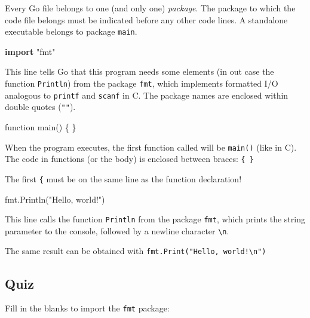 \documentclass[]{book}
\newenvironment{Shaded}{\begin{snugshade}}{\end{snugshade}}
\newcommand{\KeywordTok}[1]{\textcolor[rgb]{0.13,0.29,0.53}{\textbf{#1}}}
\newcommand{\NormalTok}[1]{#1}
\newcommand{\StringTok}[1]{\textcolor[rgb]{0.31,0.60,0.02}{#1}}
\let\BeginKnitrBlock\begin \let\EndKnitrBlock\end
\begin{document}
Every Go file belongs to one (and only one) \emph{package}. The package to which the
code file belongs must be indicated before any other code lines. A standalone
executable belongs to package \texttt{main}.

\begin{Shaded}
\begin{Highlighting}[]
\KeywordTok{import} \StringTok{"fmt"}
\end{Highlighting}
\end{Shaded}

This line tells Go that this program needs some elements (in out case the
function \texttt{Println}) from the package \texttt{fmt}, which implements formatted I/O
analogous to \texttt{printf} and \texttt{scanf} in C. The package names are enclosed within
double quotes (\texttt{""}).

\begin{Shaded}
\begin{Highlighting}[]
\NormalTok{function main() \{ \}}
\end{Highlighting}
\end{Shaded}

When the program executes, the first function called will be \texttt{main()} (like in
C). The code in functions (or the body) is enclosed between braces: \texttt{\{\ \}}

\BeginKnitrBlock{rmdnote}
The first \texttt{\{} must be on the same line as the function declaration!
\EndKnitrBlock{rmdnote}

\begin{Shaded}
\begin{Highlighting}[]
\NormalTok{    fmt.Println(}\StringTok{"Hello, world!"}\NormalTok{)}
\end{Highlighting}
\end{Shaded}

This line calls the function \texttt{Println} from the package \texttt{fmt}, which prints the
string parameter to the console, followed by a newline character \texttt{\textbackslash{}n}.

\BeginKnitrBlock{rmdnote}
The same result can be obtained with \texttt{fmt.Print("Hello,\ world!\textbackslash{}n")}
\EndKnitrBlock{rmdnote}

\hypertarget{quiz-2}{%
\subsection{Quiz}\label{quiz-2}}

Fill in the blanks to import the \texttt{fmt} package:
\end{document}
